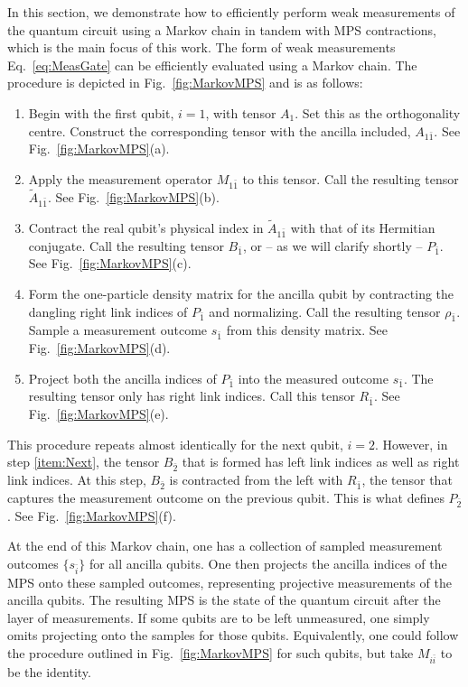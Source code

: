 \documentclass[reprint,amsmath,amssymb,aps, twocolumn, superscriptaddress, prb]{revtex4-2}
\begin{document}
In this section, we demonstrate how to efficiently perform weak measurements of the quantum circuit using a Markov chain in tandem with MPS contractions, which is the main focus of this work. The form of weak measurements Eq.~\eqref{eq:MeasGate} can be efficiently evaluated using a Markov chain. The procedure is depicted in Fig.~\ref{fig:MarkovMPS} and is as follows:
%
\begin{enumerate}
    \item Begin with the first qubit, $i=1$, with tensor $A_1$. Set this as the orthogonality centre. Construct the corresponding tensor with the ancilla included, $A_{1\bar{1}}$. See Fig.~\ref{fig:MarkovMPS}(a).
    \item Apply the measurement operator $M_{1\bar{1}}$ to this tensor. Call the resulting tensor $\tilde{A}_{1 \bar{1}}$. See Fig.~\ref{fig:MarkovMPS}(b).\label{item:Meas}
    \item  Contract the real qubit's physical index in $\tilde{A}_{1 \bar{1}}$ with that of its Hermitian conjugate. Call the resulting tensor $B_{\bar{1}}$, or -- as we will clarify shortly -- $P_{\bar{1}}$. See Fig.~\ref{fig:MarkovMPS}(c).  \label{item:Next}
    \item Form the one-particle density matrix for the ancilla qubit by contracting the dangling right link indices of $P_{\bar{1}}$ and normalizing. Call the resulting tensor $\rho_{\bar{1}}$. Sample a measurement outcome $s_{\bar{1}}$ from this density matrix. See Fig.~\ref{fig:MarkovMPS}(d).
    \item Project both the ancilla indices of $P_{\bar{1}}$ into the measured outcome $s_{\bar{1}}$. The resulting tensor only has right link indices. Call this tensor $R_{\bar{1}}$. See Fig.~\ref{fig:MarkovMPS}(e).
\end{enumerate}
%
This procedure repeats almost identically for the next qubit, $i=2$. However, in step \ref{item:Next}, the tensor $B_{\bar{2}}$ that is formed has left link indices as well as right link indices. At this step, $B_{\bar{2}}$ is contracted from the left with $R_{\bar{1}}$, the tensor that captures the measurement outcome on the previous qubit. This is what defines $P_{\bar{2}}$. See Fig.~\ref{fig:MarkovMPS}(f). 

At the end of this Markov chain, one has a collection of sampled measurement outcomes $\{s_{\bar{i}}\}$ for all ancilla qubits. One then projects the ancilla indices of the MPS onto these sampled outcomes, representing projective measurements of the ancilla qubits. The resulting MPS is the state of the quantum circuit after the layer of measurements. If some qubits are to be left unmeasured, one simply omits projecting onto the samples for those qubits. Equivalently, one could follow the procedure outlined in Fig.~\ref{fig:MarkovMPS} for such qubits, but take $M_{i\bar{i}}$ to be the identity.
\end{document}
